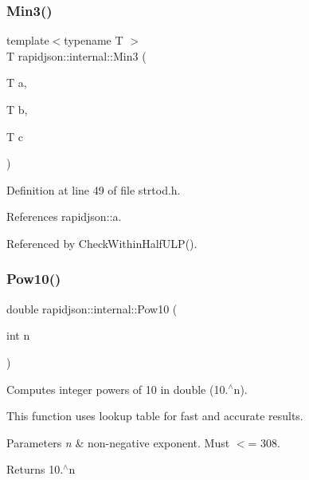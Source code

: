 \subsubsection{\texorpdfstring{Min3()}{Min3()}}
{\footnotesize\ttfamily template$<$typename T $>$ \\
T rapidjson\+::internal\+::\+Min3 (\begin{DoxyParamCaption}\item[{T}]{a,  }\item[{T}]{b,  }\item[{T}]{c }\end{DoxyParamCaption})}



Definition at line 49 of file strtod.\+h.


\begin{DoxyCode}{0}

\end{DoxyCode}


References rapidjson\+::a.



Referenced by Check\+Within\+Half\+U\+L\+P().

\mbox{\label{namespacerapidjson_1_1internal_aba2871b1440237f69acb5ae602407bf9}} 
\subsubsection{\texorpdfstring{Pow10()}{Pow10()}}
{\footnotesize\ttfamily double rapidjson\+::internal\+::\+Pow10 (\begin{DoxyParamCaption}\item[{int}]{n }\end{DoxyParamCaption})}



Computes integer powers of 10 in double (10.$^\wedge$n). 

This function uses lookup table for fast and accurate results. 
\begin{DoxyParams}{Parameters}
{\em n} & non-\/negative exponent. Must $<$= 308. \\
\hline
\end{DoxyParams}
\begin{DoxyReturn}{Returns}
10.$^\wedge$n 
\end{DoxyReturn}


